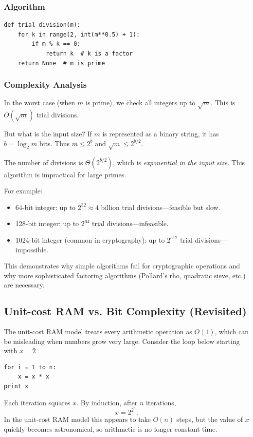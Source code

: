 \documentclass[11pt]{article}
\begin{document}
\subsubsection*{Algorithm}
\begin{lstlisting}
def trial_division(m):
    for k in range(2, int(m**0.5) + 1):
        if m % k == 0:
            return k  # k is a factor
    return None  # m is prime
\end{lstlisting}

\subsubsection*{Complexity Analysis}
In the worst case (when $m$ is prime), we check all integers up to $\sqrt{m}$. This is $O(\sqrt{m})$ trial divisions.

But what is the input size? If $m$ is represented as a binary string, it has $b = \log_2 m$ bits. Thus $m \le 2^b$ and $\sqrt{m} \le 2^{b/2}$.

The number of divisions is $\Theta(2^{b/2})$, which is \emph{exponential in the input size}. This algorithm is impractical for large primes.

For example:
\begin{itemize}
\item 64-bit integer: up to $2^{32} \approx 4$ billion trial divisions—feasible but slow.
\item 128-bit integer: up to $2^{64}$ trial divisions—infeasible.
\item 1024-bit integer (common in cryptography): up to $2^{512}$ trial divisions—impossible.
\end{itemize}

This demonstrates why simple algorithms fail for cryptographic operations and why more sophisticated factoring algorithms (Pollard's rho, quadratic sieve, etc.) are necessary.

\subsection*{Unit-cost RAM vs. Bit Complexity (Revisited)}
The unit-cost RAM model treats every arithmetic operation as $O(1)$, which can be misleading when
numbers grow very large. Consider the loop below starting with $x=2$

\begin{verbatim}
for i = 1 to n:
	x = x * x
print x
\end{verbatim}

Each iteration squares $x$. By induction, after $n$ iterations,
\[
x = 2^{2^n}.
\]
In the unit-cost RAM model this appears to take $O(n)$ steps, but the value of $x$ quickly becomes
astronomical, so arithmetic is no longer constant time.
\end{document}

